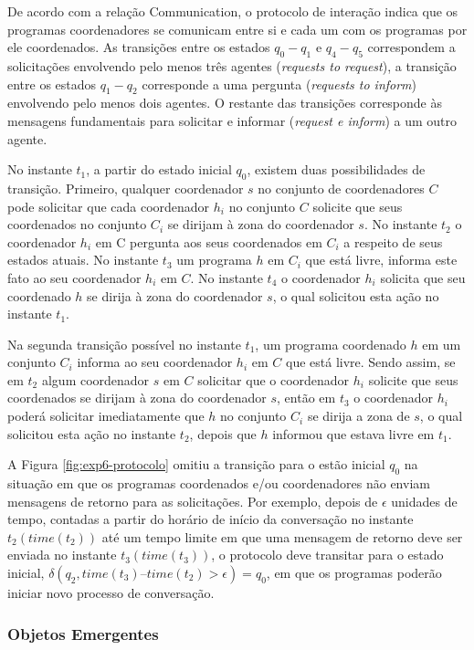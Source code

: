 De acordo com a relação Communication, o protocolo de interação indica que os programas coordenadores se comunicam entre si e cada um com os programas por ele coordenados. As transições entre os estados $q_0-q_1$ e $q_4-q_5$ correspondem a solicitações envolvendo pelo menos três agentes (\textit{requests to request}), a transição entre os estados $q_1-q_2$ corresponde a uma pergunta (\textit{requests to inform}) envolvendo pelo menos dois agentes. O restante das transições corresponde às mensagens fundamentais para solicitar e informar (\textit{request e inform}) a um outro agente.

No instante $t_1$, a partir do estado inicial $q_0$, existem duas possibilidades de transição. Primeiro, qualquer coordenador $s$ no conjunto de coordenadores $C$ pode solicitar que cada coordenador $h_i$ no conjunto $C$ solicite que seus coordenados no conjunto $C_i$ se dirijam à zona do coordenador $s$. No instante $t_2$ o coordenador $h_i$ em C pergunta aos seus coordenados em $C_i$ a respeito de seus estados atuais. No instante $t_3$ um programa $h$ em $C_i$ que está livre, informa este fato ao seu coordenador $h_i$ em $C$. No instante $t_4$ o coordenador $h_i$ solicita que seu coordenado $h$ se dirija à zona do coordenador $s$, o qual solicitou esta ação no instante $t_1$.

Na segunda transição possível no instante $t_1$, um programa coordenado $h$ em um conjunto $C_i$ informa ao seu coordenador $h_i$ em $C$ que está livre. Sendo assim, se em $t_2$ algum coordenador $s$ em $C$ solicitar que o coordenador $h_i$ solicite que seus coordenados se dirijam à zona do coordenador $s$, então em $t_3$ o coordenador $h_i$ poderá solicitar imediatamente que $h$ no conjunto $C_i$ se dirija a zona de $s$, o qual solicitou esta ação no instante $t_2$, depois que $h$ informou que estava livre em $t_1$. 

A Figura \ref{fig:exp6-protocolo} omitiu a transição para o estão inicial $q_0$ na situação em que os programas coordenados e/ou coordenadores não enviam mensagens de retorno para as solicitações. Por exemplo, depois de $\epsilon$ unidades de tempo, contadas a partir do horário de início da conversação no instante $t_2 (time(t_2))$ até um tempo limite em que uma mensagem de retorno deve ser enviada no instante $t_3 (time(t_3))$, o protocolo deve transitar para o estado inicial, $\delta(q_2, time(t_3) – time(t_2) > \epsilon) = q_0$, em que os programas poderão iniciar novo processo de conversação.

\subsubsection{Objetos Emergentes}

